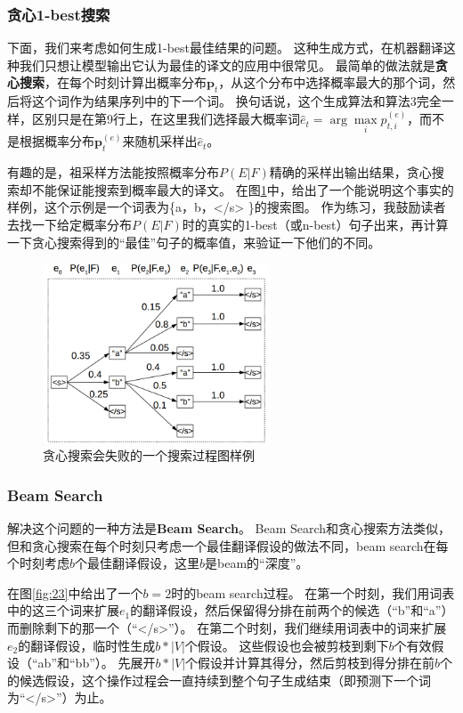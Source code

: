 \documentclass[10pt,a4paper]{ctexart}
\begin{document}
\subsubsection{贪心1-best搜索}
下面，我们来考虑如何生成1-best最佳结果的问题。
这种生成方式，在机器翻译这种我们只想让模型输出它认为最佳的译文的应用中很常见。
最简单的做法就是\textbf{贪心搜索}，在每个时刻计算出概率分布$\textbf{p}_t$，从这个分布中选择概率最大的那个词，然后将这个词作为结果序列中的下一个词。
换句话说，这个生成算法和算法3完全一样，区别只是在第9行上，在这里我们选择最大概率词$\hat{e}_t = \arg \max \limits_{i} p_{t,i}^{(e)}$，而不是根据概率分布$\textbf{p}_t^{(e)}$来随机采样出$\hat{e}_t$。

有趣的是，祖采样方法能按照概率分布$P(E|F)$精确的采样出输出结果，贪心搜索却不能保证能搜索到概率最大的译文。
在图\ref{fig:22}中，给出了一个能说明这个事实的样例，这个示例是一个词表为\{a，b，</s> \}的搜索图。
作为练习，我鼓励读者去找一下给定概率分布$P(E|F)$时的真实的1-best（或n-best）句子出来，再计算一下贪心搜索得到的“最佳”句子的概率值，来验证一下他们的不同。

\begin{figure}[H]
\centering
\includegraphics[width=0.6\textwidth]{fig22.png}
\caption{贪心搜索会失败的一个搜索过程图样例}
\label{fig:22}
\end{figure}

\subsubsection{Beam Search}
解决这个问题的一种方法是\textbf{Beam Search}。
Beam Search和贪心搜索方法类似，但和贪心搜索在每个时刻只考虑一个最佳翻译假设的做法不同，beam search在每个时刻考虑$b$个最佳翻译假设，这里$b$是beam的“深度”。

在图\ref{fig:23}中给出了一个$b=2$时的beam search过程。
在第一个时刻，我们用词表中的这三个词来扩展$e_1$的翻译假设，然后保留得分排在前两个的候选（“b”和“a”）而删除剩下的那一个（“</s>”）。
在第二个时刻，我们继续用词表中的词来扩展$e_2$的翻译假设，临时性生成$b * |V|$个假设。
这些假设也会被剪枝到剩下$b$个有效假设（“ab”和“bb”）。
先展开$b * |V|$个假设并计算其得分，然后剪枝到得分排在前$b$个的候选假设，这个操作过程会一直持续到整个句子生成结束（即预测下一个词为“</s>”）为止。
\end{document}
